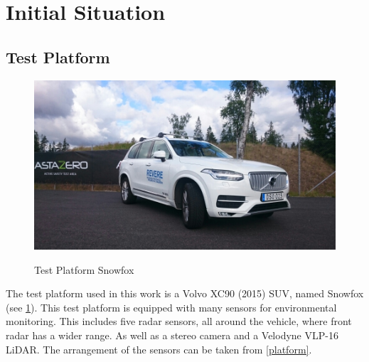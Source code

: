 \section{Initial Situation}


\subsection{Test Platform}

\begin{figure}[!ht]
\caption{Test Platform Snowfox}
\includegraphics[width=\columnwidth]{bilder/snowfox.jpg}
\label{snowfox}
\end{figure}


The test platform used in this work is a Volvo XC90 (2015) SUV, named Snowfox (see \cref{snowfox}). 
This test platform is equipped with many sensors for environmental monitoring. This includes five radar sensors, all around the vehicle, where front radar has a wider range.
As well as a stereo camera and a Velodyne VLP-16 LiDAR. The arrangement of the sensors can be taken from \cref{platform}.


